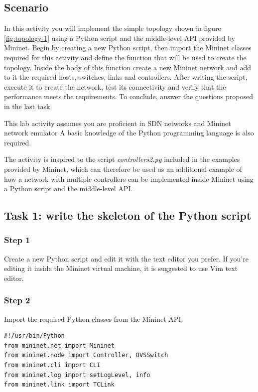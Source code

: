 \subsection*{Scenario}
In this activity you will implement the simple topology shown in figure \ref{fig:topology-1} using
a Python script and the middle-level API provided by Mininet.
Begin by creating a new Python script, then import the Mininet classes required for
this activity and define the function that will be used to create the topology.
Inside the body of this function create a new Mininet network and add to it the
required hosts, switches, links and controllers. After writing the script, execute
it to create the network, test its connectivity and verify that the performance
meets the requirements. To conclude, answer the questions proposed in the last task.

This lab activity assumes you are proficient in SDN networks and Mininet network
emulator %
A basic knowledge of the Python programming language is also required.

The activity is inspired to the script \textit{controllers2.py} \cite{ref-3} included in the
examples provided by Mininet, which can therefore be used as
an additional example of how a network with multiple controllers can be implemented
inside Mininet using a Python script and the middle-level API.




\subsection*{Task 1: write the skeleton of the Python script}
\subsubsection*{Step 1}
Create a new Python script and edit it with the text editor you prefer. If you're editing
it inside the Mininet virtual machine, it is suggested to use Vim text editor.

\subsubsection*{Step 2}
Import the required Python classes from the Mininet API:
\begin{lstlisting}
#!/usr/bin/Python
from mininet.net import Mininet
from mininet.node import Controller, OVSSwitch
from mininet.cli import CLI
from mininet.log import setLogLevel, info
from mininet.link import TCLink
\end{lstlisting}

